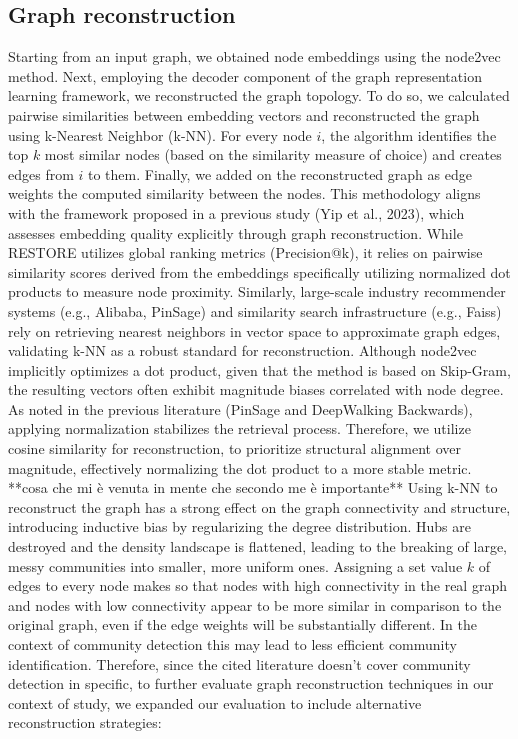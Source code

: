 \documentclass[a4paper,11pt]{article}
\begin{document}
\subsection{Graph reconstruction}
Starting from an input graph, we obtained node embeddings using the node2vec method. Next, employing the decoder component of the graph representation learning framework, we reconstructed the graph topology. To do so, we calculated pairwise similarities between embedding vectors and reconstructed the graph using k-Nearest Neighbor (k-NN). For every node $i$, the algorithm identifies the top $k$ most similar nodes (based on the similarity measure of choice) and creates edges from $i$ to them. Finally, we added on the reconstructed graph as edge weights the computed similarity between the nodes.
This methodology aligns with the framework proposed in a previous study (Yip et al., 2023), which assesses embedding quality explicitly through graph reconstruction. While RESTORE utilizes global ranking metrics (Precision@k), it relies on pairwise similarity scores derived from the embeddings specifically utilizing normalized dot products to measure node proximity. Similarly, large-scale industry recommender systems (e.g., Alibaba, PinSage) and similarity search infrastructure (e.g., Faiss) rely on retrieving nearest neighbors in vector space to approximate graph edges, validating k-NN as a robust standard for reconstruction.
Although node2vec implicitly optimizes a dot product, given that the method is based on Skip-Gram, the resulting vectors often exhibit magnitude biases correlated with node degree. As noted in the previous literature (PinSage and DeepWalking Backwards), applying normalization stabilizes the retrieval process. Therefore, we utilize cosine similarity for reconstruction, to prioritize structural alignment over magnitude, effectively normalizing the dot product to a more stable metric.
\newline
**cosa che mi è venuta in mente che secondo me è importante**
Using k-NN to reconstruct the graph has a strong effect on the graph connectivity and structure, introducing inductive bias by regularizing the degree distribution. Hubs are destroyed and the density landscape is flattened, leading to the breaking of large, messy communities into smaller, more uniform ones. Assigning a set value $k$ of edges to every node makes so that nodes with high connectivity in the real graph and nodes with low connectivity appear to be more similar in comparison to the original graph, even if the edge weights will be substantially different. In the context of community detection this may lead to less efficient community identification. Therefore, since the cited literature doesn't cover community detection in specific, to further evaluate graph reconstruction techniques in our context of study, we expanded our evaluation to include alternative reconstruction strategies:
\end{document}
